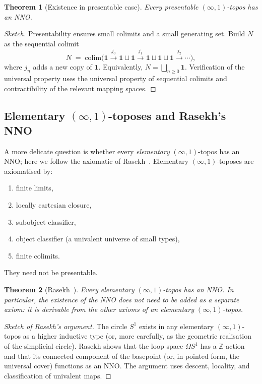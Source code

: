 \documentclass[12pt]{article}
\newtheorem{theorem}{Theorem}[section]
\theoremstyle{definition}
\theoremstyle{remark}
\newcommand{\Z}{\mathbb{Z}}
\newcommand{\Sone}{S^{1}}
\newcommand{\colim}{\mathrm{colim}}
\begin{document}
\begin{theorem}[Existence in presentable case]\label{thm:exist-pres}
Every presentable $(\infty,1)$-topos has an NNO\@.
\end{theorem}

\begin{proof}[Sketch]
Presentability ensures small colimits and a small generating set. Build $N$ as the sequential colimit
\[
N \;=\; \colim\bigl(\mathbf{1}\xrightarrow{j_{0}}\mathbf{1}\sqcup\mathbf{1}\xrightarrow{j_{1}}\mathbf{1}\sqcup\mathbf{1}\sqcup\mathbf{1}\xrightarrow{j_{2}}\cdots\bigr),
\]
where $j_{n}$ adds a new copy of $\mathbf{1}$. Equivalently, $N=\bigsqcup_{n\geq 0}\mathbf{1}$. Verification of the universal property uses the universal property of sequential colimits and contractibility of the relevant mapping spaces.
\end{proof}

\subsection{Elementary \texorpdfstring{$(\infty,1)$}{(infinity,1)}-toposes and Rasekh's NNO}

A more delicate question is whether every \emph{elementary} $(\infty,1)$-topos has an NNO; here we follow the axiomatic of Rasekh~\cite{Rasekh2018ETop}. Elementary $(\infty,1)$-toposes are axiomatised by:
\begin{enumerate}
  \item finite limits,
  \item locally cartesian closure,
  \item subobject classifier,
  \item object classifier (a univalent universe of small types),
  \item finite colimits.
\end{enumerate}
They need not be presentable.

\begin{theorem}[Rasekh~\cite{Rasekh2021}]\label{thm:rasekh}
Every elementary $(\infty,1)$-topos has an NNO\@. In particular, the existence of the NNO does not need to be added as a separate axiom: it is derivable from the other axioms of an elementary $(\infty,1)$-topos.
\end{theorem}

\begin{proof}[Sketch of Rasekh's argument]
The circle $\Sone$ exists in any elementary $(\infty,1)$-topos as a higher inductive type (or, more carefully, as the geometric realisation of the simplicial circle). Rasekh shows that the loop space $\Omega\Sone$ has a $\Z$-action and that its connected component of the basepoint (or, in pointed form, the universal cover) functions as an NNO\@. The argument uses descent, locality, and classification of univalent maps.
\end{proof}
\end{document}
